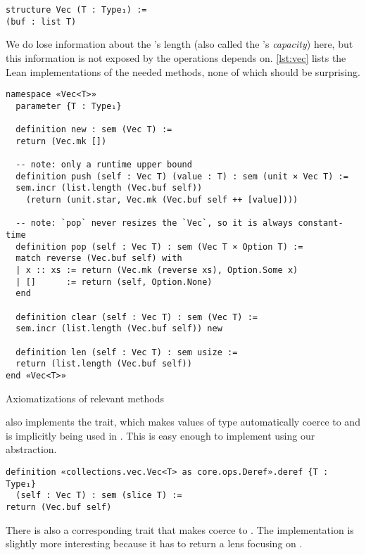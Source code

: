 \begin{verbatim}
structure Vec (T : Type₁) :=
(buf : list T)
\end{verbatim}

We do lose information about the 's length (also called the
's \emph{capacity}) here, but this information is not exposed by the
 operations  depends on. \autoref{lst:vec} lists the Lean implementations of
the needed  methods, none of which should be surprising.

\begin{listing}[bt!]
\begin{verbatim}
namespace «Vec<T>»
  parameter {T : Type₁}

  definition new : sem (Vec T) :=
  return (Vec.mk [])

  -- note: only a runtime upper bound
  definition push (self : Vec T) (value : T) : sem (unit × Vec T) :=
  sem.incr (list.length (Vec.buf self))
    (return (unit.star, Vec.mk (Vec.buf self ++ [value])))

  -- note: `pop` never resizes the `Vec`, so it is always constant-time
  definition pop (self : Vec T) : sem (Vec T × Option T) :=
  match reverse (Vec.buf self) with
  | x :: xs := return (Vec.mk (reverse xs), Option.Some x)
  | []      := return (self, Option.None)
  end

  definition clear (self : Vec T) : sem (Vec T) :=
  sem.incr (list.length (Vec.buf self)) new

  definition len (self : Vec T) : sem usize :=
  return (list.length (Vec.buf self))
end «Vec<T>»
\end{verbatim}
  
  \caption{Axiomatizations of relevant  methods}
  \label{lst:vec}
\end{listing}

 also implements the  trait, which makes values of type
 automatically coerce to \rust{&[T]} and is implicitly being used
in . This is easy enough to implement using our abstraction.

\begin{verbatim}
definition «collections.vec.Vec<T> as core.ops.Deref».deref {T : Type₁}
  (self : Vec T) : sem (slice T) :=
return (Vec.buf self)
\end{verbatim}

There is also a corresponding  trait that makes  coerce to . The implementation is slightly more
interesting because it has to return a lens focusing on .

